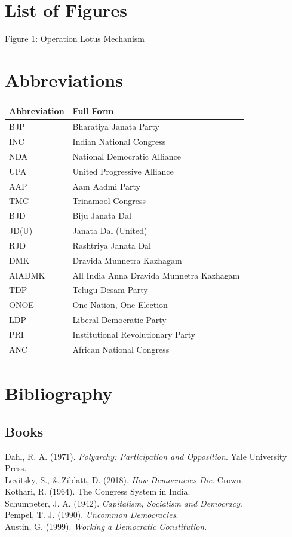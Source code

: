 \documentclass[11pt]{article}
\begin{document}
\section*{List of Figures}
Figure 1: Operation Lotus Mechanism

\section*{Abbreviations}
\begin{longtable}{ll}
\toprule
Abbreviation & Full Form\\
\midrule
BJP & Bharatiya Janata Party\\
INC & Indian National Congress\\
NDA & National Democratic Alliance\\
UPA & United Progressive Alliance\\
AAP & Aam Aadmi Party\\
TMC & Trinamool Congress\\
BJD & Biju Janata Dal\\
JD(U) & Janata Dal (United)\\
RJD & Rashtriya Janata Dal\\
DMK & Dravida Munnetra Kazhagam\\
AIADMK & All India Anna Dravida Munnetra Kazhagam\\
TDP & Telugu Desam Party\\
ONOE & One Nation, One Election\\
LDP & Liberal Democratic Party\\
PRI & Institutional Revolutionary Party\\
ANC & African National Congress\\
\bottomrule
\end{longtable}

\section*{Bibliography}
\subsection*{Books}
Dahl, R. A. (1971). \emph{Polyarchy: Participation and Opposition}. Yale University Press.\\
Levitsky, S., \& Ziblatt, D. (2018). \emph{How Democracies Die}. Crown.\\
Kothari, R. (1964). The Congress System in India.\\
Schumpeter, J. A. (1942). \emph{Capitalism, Socialism and Democracy}.\\
Pempel, T. J. (1990). \emph{Uncommon Democracies}.\\
Austin, G. (1999). \emph{Working a Democratic Constitution}.
\end{document}
